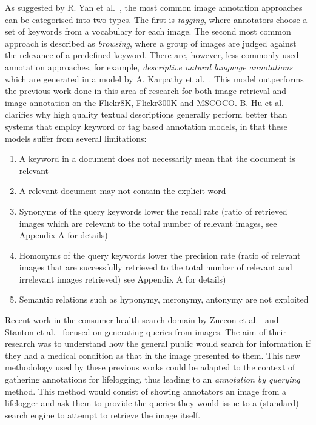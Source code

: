 \documentclass[12pt,a4paper]{article}
\begin{document}
As suggested by R. Yan et al.~\cite{yan2008learning}, the most common image annotation approaches can be categorised into two types. The first is \textit{tagging}, where annotators choose a set of keywords from a vocabulary for each image. The second most common approach is described as \textit{browsing}, where a group of images are judged against the relevance of a predefined keyword. There are, however, less commonly used annotation approaches, for example, \textit{descriptive natural language annotations} which are generated in a model by A. Karpathy et al.~\cite{karpathy2015deep}. This model outperforms the previous work done in this area of research for both image retrieval and image annotation on the Flickr8K, Flickr300K and MSCOCO. B. Hu et al.~\cite{hu2003ontology} clarifies why high quality textual descriptions generally perform better than systems that employ keyword or tag based annotation models, in that these models suffer from several limitations:
\begin{enumerate}
    \item A keyword in a document does not necessarily mean that the document is relevant
    \item A relevant document may not contain the explicit word
    \item Synonyms of the query keywords lower the recall rate (ratio of retrieved images which are relevant to the total number of relevant images, see Appendix A for details)
    \item Homonyms of the query keywords lower the precision rate  (ratio of relevant images that are successfully retrieved to the total number of relevant and irrelevant images retrieved) see Appendix A for details)
    \item Semantic relations such as hyponymy, meronymy, antonymy are not exploited
\end{enumerate}

Recent work in the consumer health search domain by Zuccon et al.~\cite{quteprints82599} and Stanton et al.~\cite{stanton2014circumlocution} focused on generating queries from images. The aim of their research was to understand how the general public would search for information if they had a medical condition as that in the image presented to them. This new methodology used by these previous works could be adapted to the context of gathering annotations for lifelogging, thus leading to an \textit{annotation by querying} method. This method would consist of showing annotators an image from a lifelogger and ask them to provide the queries they would issue to a (standard) search engine to attempt to retrieve the image itself.
\end{document}

